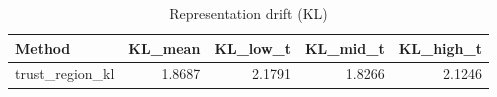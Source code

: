 \begin{table}[htbp]
\centering
\caption{Representation drift (KL)}
\label{tab:repr-drift}
\begin{tabular}{lrrrr}
\toprule
\textbf{Method} & \textbf{KL\_mean} & \textbf{KL\_low\_t} & \textbf{KL\_mid\_t} & \textbf{KL\_high\_t} \\
\midrule
trust\_region\_kl & 1.8687 & 2.1791 & 1.8266 & 2.1246 \\
\bottomrule
\end{tabular}
\end{table}